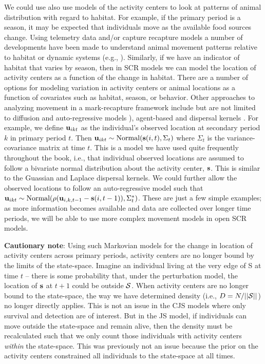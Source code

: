 We could use also use models of the activity centers to look at
patterns of animal distribution with regard to habitat.  For example,
if the primary period is a season, it may be expected that individuals
move as the available food sources change. Using telemetry data and/or
capture recapture models a number of developments have been made to
understand animal movement patterns relative to habitat or dynamic
systems (e.g., \cite{jonsen_etal:2005, hooten_wikle:2010}).
Similarly, if we have an indicator of habitat that varies by season,
then in SCR models we can model the location of activity centers as a
function of the change in habitat.  There are a number of options for
modeling variation in activity centers or animal locations as a
function of covariates such as habitat, season, or behavior.  Other
approaches to analyzing movement in a mark-recapture framework include
but are not limited to diffusion and auto-regressive models
\citep{ovaskainen:2004, ovaskainen_etal:2008}), agent-based
\citep{grimm_etal:2005, hooten_etal:2010} and dispersal kernels
\citep{fujiwara_etal:2006}.  For example, we define ${\bf u}_{ikt}$ as
the individual's observed location at secondary period $k$ in primary
period $t$.  Then ${\bf u}_{ikt} \sim \mbox{Normal}({\bf s}(i,t),
\Sigma_t)$ where $\Sigma_t$ is the variance-covariance matrix at time
$t$.  This is a model we have used quite frequently throughout the
book, i.e., that individual observed locations are assumed to follow a
bivariate normal distribution about the activity center, ${\bf s}$.
This is similar to
the Guassian and Laplace dispersal kernels.  We could further allow the
observed locations to follow an auto-regressive model such that ${\bf
  u}_{ikt} \sim \mbox{Normal}(\rho ({\bf u}_{i,k,t-1} - {\bf
  s}(i,t-1)), \Sigma^{*}_t)$.  These are just a few simple examples; as
more information becomes available and data are collected over longer
time periods, we will be able to use more complex movement models in open SCR models.



{\flushleft \bf Cautionary note}: 
Using such Markovian models for the
change in location of activity centers across primary periods,
activity centers are no longer bound by the limits of the state-space.
Imagine an individual living at the very edge of S at time $t$ --
there is some probability that, under the perturbation model, the
location of ${\bf s}$ at $t+1$ could be outside ${\cal S}$.  When
activity centers are no longer bound to the state-space, the way we
have determined density (i.e., $D = N/||{\cal S}||$) no longer
directly applies.  This is not an issue in the CJS models where only
survival and detection are of interest.  But in the JS model, if
individuals can move outside the state-space and remain alive, then
the density must be recalculated such that we only count those
individuals with activity centers {\it within} the state-space.  This
was previously not an issue because the prior on the activity centers
constrained all individuals to the state-space at all times.


